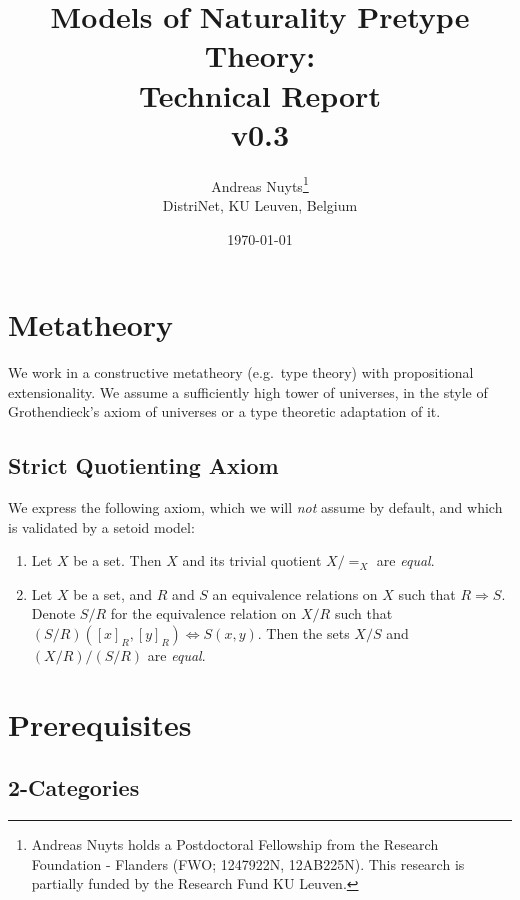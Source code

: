 \documentclass[a4paper]{memoir}
\newcommand{\thetitle}{Models of Naturality Pretype Theory: \\ Technical Report \\ v0.3}
\newcommand{\theauthors}{Andreas Nuyts\thanks{Andreas Nuyts holds a Postdoctoral Fellowship from the Research Foundation - Flanders (FWO; 1247922N, 12AB225N). This research is partially funded by the Research Fund KU Leuven.} \\ DistriNet, KU Leuven, Belgium}
\begin{document}
	\addtolength{\voffset}{-.5in}

\title{\thetitle}
\date{\today}
\author{\theauthors{}}
\maketitle

\pagebreak

\tableofcontents


\chapter*{Metatheory} \label{ch:metatheory}
We work in a constructive metatheory (e.g.\ type theory) with propositional extensionality.
We assume a sufficiently high tower of universes, in the style of Grothendieck's axiom of universes or a type theoretic adaptation of it. 

\section*{Strict Quotienting Axiom}
We express the following axiom, which we will \emph{not} assume by default, and which is validated by a setoid model:
\begin{axiom} \label{ax:bishop}
	\begin{enumerate}
		\item Let $X$ be a set. Then $X$ and its trivial quotient $X/{=}_X$ are \emph{equal}.
		\item Let $X$ be a set, and $R$ and $S$ an equivalence relations on $X$ such that $R \Rightarrow S$.
			Denote $S/R$ for the equivalence relation on $X/R$ such that $(S/R)([x]_R, [y]_R) \Leftrightarrow S(x, y)$.
			Then the sets $X/S$ and $(X/R)/(S/R)$ are \emph{equal}.
	\end{enumerate}
\end{axiom}

\chapter{Prerequisites} \label{ch:prereq}

\section{2-Categories}
\end{document}

